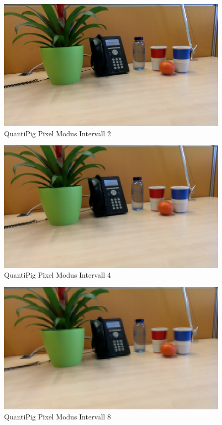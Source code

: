 \begin{landscape}
\begin{figure}[h]
	\centering
		\includegraphics[width=1.4\textwidth]{img/Fotos/QuantiPig_Pixel_2.png}
	\caption[QuantiPig Pixel Modus Intervall 2]{QuantiPig Pixel Modus Intervall 2}
	\label{fig:pig_pix2}
\end{figure}

\begin{figure}[h]
	\centering
		\includegraphics[width=1.4\textwidth]{img/Fotos/QuantiPig_Pixel_4.png}
	\caption[QuantiPig Pixel Modus Intervall 4]{QuantiPig Pixel Modus Intervall 4}
	\label{fig:pig_pix4}
\end{figure}

\begin{figure}[h]
	\centering
		\includegraphics[width=1.4\textwidth]{img/Fotos/QuantiPig_Pixel_8.png}
	\caption[QuantiPig Pixel Modus Intervall 8]{QuantiPig Pixel Modus Intervall 8}
	\label{fig:pig_pix8}
\end{figure}


\end{landscape}
